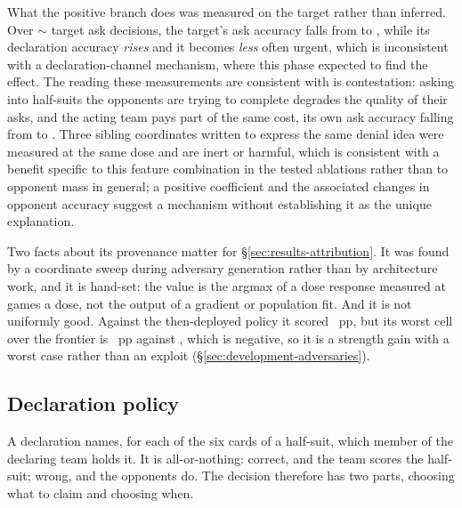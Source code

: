 What the positive branch does was measured on the target rather than inferred. Over
$\sim$\vsevenContestDecisions{} target ask decisions, the target's ask accuracy falls from
\vsevenContestTargetAskBefore{} to \vsevenContestTargetAskAfter{}, while its declaration accuracy
\emph{rises} and it becomes \emph{less} often urgent, which is inconsistent with a declaration-channel
mechanism, where this phase expected to find the effect. The reading these measurements are
consistent with is contestation: asking into half-suits the opponents are trying to complete
degrades the quality of their asks, and the acting team pays part of the same cost, its own ask
accuracy falling from \vsevenContestSelfAskBefore{} to \vsevenContestSelfAskAfter{}. Three sibling
coordinates written to express the same denial idea were measured at the same dose and are inert or
harmful, which is consistent with a benefit specific to this feature combination in the tested
ablations rather than to opponent mass in general; a positive coefficient and the associated changes
in opponent accuracy suggest a mechanism without establishing it as the unique explanation.

Two facts about its provenance matter for \S\ref{sec:results-attribution}. It was found by a
coordinate sweep during adversary generation rather than by architecture work, and it is hand-set:
the value \texttt{\vsevenContestWeight{}} is the argmax of a dose response measured at
\vsevenPhaseTwoCell{} games a dose, not the output of a gradient or population fit. And it is not
uniformly good. Against the then-deployed policy it scored \vsevenOneSwitchArm{}~pp, but its worst
cell over the \vsix{} frontier is \vsevenOneSwitchArmWorst{}~pp against
\texttt{\vsevenOneSwitchArmWorstOpp{}}, which is negative, so it is a strength gain with a worst case
rather than an exploit (\S\ref{sec:development-adversaries}).

\subsection{Declaration policy}
\label{sec:agent-declare}

A declaration names, for each of the six cards of a half-suit, which member of the declaring team
holds it. It is all-or-nothing: correct, and the team scores the half-suit; wrong, and the opponents
do. The decision therefore has two parts, choosing what to claim and choosing when.

